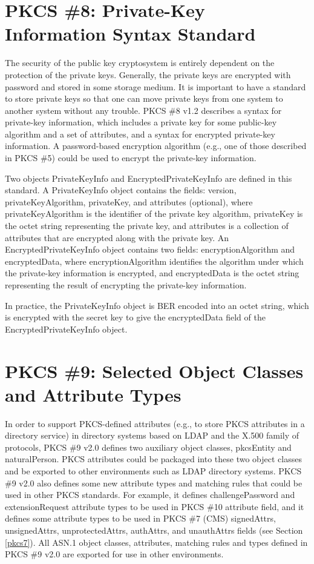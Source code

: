 \documentclass{article}
\begin{document}
\section{PKCS \#8: Private-Key Information Syntax Standard}
\label{pkcs8}
The security of the public key cryptosystem is entirely dependent
on the protection of the private keys. Generally, the private keys
are encrypted with password and stored in some storage medium.
It is important to have a standard to store private keys
so that one can move private keys from one system to another system
without any trouble.
PKCS \#8 v1.2 describes a syntax for private-key information,
which includes a private key for some public-key algorithm and 
a set of attributes, and a syntax for encrypted private-key information. 
A password-based encryption algorithm 
(e.g., one of those described in PKCS \#5) could be used to encrypt 
the private-key information.

Two objects PrivateKeyInfo and 
EncryptedPrivateKeyInfo are defined in this standard. 
A PrivateKeyInfo object
contains the fields: version, privateKeyAlgorithm, privateKey,
and attributes (optional), where privateKeyAlgorithm
is the identifier of the private key algorithm, privateKey
is the octet string representing the private key, and 
attributes is a collection of attributes that are encrypted
along with the private key.
An EncryptedPrivateKeyInfo object contains two fields:
encryptionAlgorithm and encryptedData,
where encryptionAlgorithm identifies the algorithm under 
which the private-key information is encrypted, and 
encryptedData is the octet string representing the result of 
encrypting the private-key information.

In practice, the PrivateKeyInfo object is BER encoded into an
octet string, which is encrypted with the secret key to give 
the encryptedData field of the EncryptedPrivateKeyInfo object.

\section{PKCS \#9: Selected Object Classes and Attribute Types}
\label{pkcs9}
In order to support PKCS-defined attributes (e.g., to store
PKCS attributes in a directory service) in 
directory systems based on LDAP and the X.500 family of protocols,
PKCS \#9 v2.0 defines two auxiliary object classes, {pkcsEntity} 
and {naturalPerson}. PKCS attributes could be packaged into these
two object classes and be exported to other environments
such as LDAP directory systems. PKCS \#9 v2.0 also defines 
some new attribute types and matching rules that could be used
in other PKCS standards. For example, it defines challengePassword and
extensionRequest attribute types to be used in PKCS \#10 attribute
field, and it defines some attribute types to 
be used in PKCS \#7 (CMS) signedAttrs, unsignedAttrs, 
unprotectedAttrs, authAttrs, and unauthAttrs fields (see 
Section \ref{pkcs7}).
All ASN.1 object classes, attributes, matching rules 
and types defined in PKCS \#9 v2.0 are exported for use 
in other environments.
\end{document}
